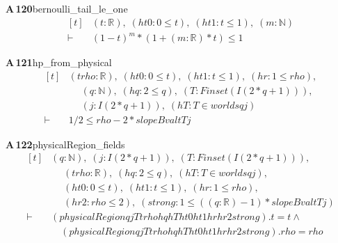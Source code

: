 \documentclass[conference]{IEEEtran}
\theoremstyle{definition}
\newcommand{\lean}[1]{\textsf{\footnotesize #1}}
\begin{document}
\noindent\textbf{A\,120}\quad\lean{bernoulli\_tail\_le\_one}
{\footnotesize\[ \begin{aligned}[t]
&(\mathit{t} : \mathbb{R} ),\; (\mathit{ht0} : 0 \leq \mathit{t}),\; (\mathit{ht1} : \mathit{t} \leq 1),\; (\mathit{m} : \mathbb{N} )\\
\vdash\;&(1-\mathit{t})^{\mathit{m}}*(1+(\mathit{m}:\mathbb{R} )*\mathit{t}) \leq 1
\end{aligned} \]}

\noindent\textbf{A\,121}\quad\lean{hp\_from\_physical}
{\footnotesize\[ \begin{aligned}[t]
&(\mathit{t} \mathit{rho} : \mathbb{R} ),\; (\mathit{ht0} : 0 \leq \mathit{t}),\; (\mathit{ht1} : \mathit{t} \leq 1),\; (\mathit{hr} : 1 \leq \mathit{rho}),\\
&\quad \; (\mathit{q} : \mathbb{N} ),\; (\mathit{hq} : 2 \leq \mathit{q}),\; (\mathit{T} : \mathit{Finset} (\mathit{I} (2*\mathit{q}+1))),\\
&\quad \; (\mathit{j} : \mathit{I} (2*\mathit{q}+1)),\; (\mathit{hT} : \mathit{T} \in \mathit{worlds} \mathit{q} \mathit{j})\\
\vdash\;&1/2 \leq \mathit{rho}-2*\mathit{slopeBval} \mathit{t} \mathit{T} \mathit{j}
\end{aligned} \]}

\noindent\textbf{A\,122}\quad\lean{physicalRegion\_fields}
{\footnotesize\[ \begin{aligned}[t]
&(\mathit{q} : \mathbb{N} ),\; (\mathit{j} : \mathit{I} (2*\mathit{q}+1)),\; (\mathit{T} : \mathit{Finset} (\mathit{I} (2*\mathit{q}+1))),\\
&\quad \; (\mathit{t} \mathit{rho} : \mathbb{R} ),\; (\mathit{hq} : 2 \leq \mathit{q}),\; (\mathit{hT} : \mathit{T} \in \mathit{worlds} \mathit{q} \mathit{j}),\\
&\quad \; (\mathit{ht0} : 0 \leq \mathit{t}),\; (\mathit{ht1} : \mathit{t} \leq 1),\; (\mathit{hr} : 1 \leq \mathit{rho}),\\
&\quad \; (\mathit{hr2} : \mathit{rho} \leq 2),\; (\mathit{strong} : 1 \leq ((\mathit{q}:\mathbb{R} )-1)*\mathit{slopeBval} \mathit{t} \mathit{T} \mathit{j})\\
\vdash\;&(\mathit{physicalRegion} \mathit{q} \mathit{j} \mathit{T} \mathit{t} \mathit{rho} \mathit{hq} \mathit{hT} \mathit{ht0} \mathit{ht1} \mathit{hr} \mathit{hr2} \mathit{strong}).\mathit{t} = \mathit{t} \wedge\\
&\quad (\mathit{physicalRegion} \mathit{q} \mathit{j} \mathit{T} \mathit{t} \mathit{rho} \mathit{hq} \mathit{hT} \mathit{ht0} \mathit{ht1} \mathit{hr} \mathit{hr2} \mathit{strong}).\mathit{rho} = \mathit{rho}
\end{aligned} \]}
\end{document}
